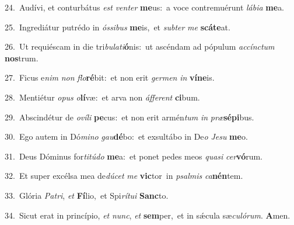 {\numbfont\textcolor{\numbcolor}{24.}}~Audívi, et conturbátus \textit{est} \textit{ven}\-\textit{ter} \textbf{me}\-us:~\star a voce contremuérunt \textit{lá}\-\textit{bi}\textit{a} \textbf{me}\-a.\par
{\numbfont\textcolor{\numbcolor}{25.}}~Ingrediátur putrédo in \textit{ós}\-\textit{si}\textit{bus} \textbf{me}\-is,~\star et \textit{sub}\-\textit{ter} \textit{me} \textbf{scá}\-\textbf{te}at.\par
{\numbfont\textcolor{\numbcolor}{26.}}~Ut requiéscam in die tri\-\textit{bu}\-\textit{la}\textit{ti}\textbf{ó}nis:~\star ut ascéndam ad pópulum \textit{ac}\-\textit{cínc}\textit{tum} \textbf{nos}\-trum.\par
{\numbfont\textcolor{\numbcolor}{27.}}~Ficus e\textit{nim} \textit{non} \textit{flo}\-\textbf{ré}bit:~\star et non erit \textit{ger}\-\textit{men} \textit{in} \textbf{ví}\-\textbf{ne}is.\par
{\numbfont\textcolor{\numbcolor}{28.}}~Mentiétur \textit{o}\-\textit{pus} \textit{o}\-\textbf{lí}væ:~\star et arva non \textit{áf}\-\textit{fe}\textit{rent} \textbf{ci}\-bum.\par
{\numbfont\textcolor{\numbcolor}{29.}}~Abscindétur de \textit{o}\-\textit{ví}\textit{li} \textbf{pe}\-cus:~\star et non erit armén\textit{tum} \textit{in} \textit{præ}\-\textbf{sé}\textbf{pi}bus.\par
{\numbfont\textcolor{\numbcolor}{30.}}~Ego autem in Dó\-\textit{mi}\-\textit{no} \textit{gau}\-\textbf{dé}bo:~\star et exsultábo in De\textit{o} \textit{Je}\-\textit{su} \textbf{me}\-o.\par
{\numbfont\textcolor{\numbcolor}{31.}}~Deus Dóminus for\-\textit{ti}\-\textit{tú}\textit{do} \textbf{me}\-a:~\star et ponet pedes meos \textit{qua}\-\textit{si} \textit{cer}\-\textbf{vó}rum.\par
{\numbfont\textcolor{\numbcolor}{32.}}~Et super excélsa mea de\-\textit{dú}\-\textit{cet} \textit{me} \textbf{vic}\-tor~\star in \textit{psal}\-\textit{mis} \textit{ca}\-\textbf{nén}tem.\par
{\numbfont\textcolor{\numbcolor}{33.}}~Glória \textit{Pa}\-\textit{tri}, \textit{et} \textbf{Fí}\-lio,~\star et Spi\-\textit{rí}\-\textit{tu}\textit{i} \textbf{Sanc}\-to.\par
{\numbfont\textcolor{\numbcolor}{34.}}~Sicut erat in princípio, \textit{et} \textit{nunc}\-, \textit{et} \textbf{sem}\-per,~\star et in sǽcula sæ\-\textit{cu}\-\textit{ló}\textit{rum}. \textbf{A}\-men.\par

